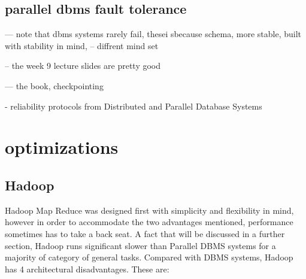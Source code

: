\documentclass[10pt,twocolumn]{IEEEtran11}
\begin{document}
\subsection{parallel dbms fault tolerance}

--- note that dbms systems rarely fail, thesei sbecause schema, more stable, built with stability in mind,
-- diffrent mind set

-- the week 9 lecture slides are pretty good

--- the book, checkpointing

- reliability protocols from Distributed and Parallel Database Systems


\section{optimizations}
\subsection{Hadoop}


Hadoop Map Reduce was designed first with simplicity and flexibility in mind, however in order to accommodate the two advantages mentioned, performance sometimes has to take a back seat. A fact that will be discussed in a further section, Hadoop runs significant slower than Parallel DBMS systems for a majority of category of general tasks. Compared with DBMS systems, Hadoop has 4 architectural disadvantages. These are:
\end{document}
